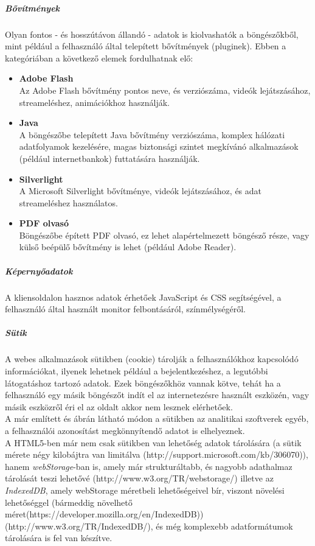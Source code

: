 \subparagraph{Bővítmények} %
\label{subp:bővítmények}
Olyan fontos - és hosszútávon állandó - adatok is kiolvashatók a böngészőkből, mint például a felhasználó által telepített bővítmények (pluginek). Ebben a kategóriában a következő elemek fordulhatnak elő:
\begin{itemize}
	\item{\textbf{Adobe Flash}}\hfill\\ 
		Az Adobe Flash bővítmény pontos neve, és verziószáma, videók lejátszásához, streameléshez, animációkhoz használják.
		
	\item{\textbf{Java}}\hfill\\ 
		A böngészőbe telepített Java bővítmény verziószáma, komplex hálózati adatfolyamok kezelésére, magas biztonsági szintet megkívánó alkalmazások (például internetbankok) futtatására használják.
	\item{\textbf{Silverlight}}\hfill\\ 
		A Microsoft Silverlight bővítménye, videók lejátszásához, és adat streameléshez használatos.
		
	\item{\textbf{PDF olvasó}}\hfill\\ 
		Böngészőbe épített PDF olvasó, ez lehet alapértelmezett böngésző része, vagy külső beépülő bővítmény is lehet (például Adobe Reader).
\end{itemize}

\subparagraph{Képernyőadatok} %
\label{subp:képernyőadatok}
A kliensoldalon hasznos adatok érhetőek JavaScript és CSS segítségével, a felhasználó által használt monitor felbontásáról, színmélységéről.

\subparagraph{Sütik} %
\label{subp:sütik}
A webes alkalmazások sütikben (cookie) tárolják a felhasználókhoz kapcsolódó információkat, ilyenek lehetnek például a bejelentkezéshez, a legutóbbi látogatáshoz tartozó adatok. Ezek böngészőkhöz vannak kötve, tehát ha a felhasználó egy másik böngészőt indít el az internetezésre használt eszközén, vagy másik eszközről éri el az oldalt akkor nem lesznek elérhetőek.\hfill\\
A már említett és  ábrán látható módon a sütikben az analitikai szoftverek egyéb, a felhasználói azonosítást megkönnyítendő adatot is elhelyeznek.\hfill\\
A HTML5-ben már nem csak sütikben van lehetőség adatok tárolására (a sütik mérete négy kilobájtra van limitálva (http://support.microsoft.com/kb/306070)), hanem \textit{webStorage}-ban is, amely már strukturáltabb, és nagyobb adathalmaz tárolását teszi lehetővé (http://www.w3.org/TR/webstorage/) illetve az \textit{IndexedDB}, amely webStorage méretbeli lehetőségeivel bír, viszont növelési lehetőséggel (bármeddig növelhető 
méret(https://developer.mozilla.org/en/IndexedDB)) (http://www.w3.org/TR/IndexedDB/), és még komplexebb adatformátumok tárolására is fel van készítve. 

